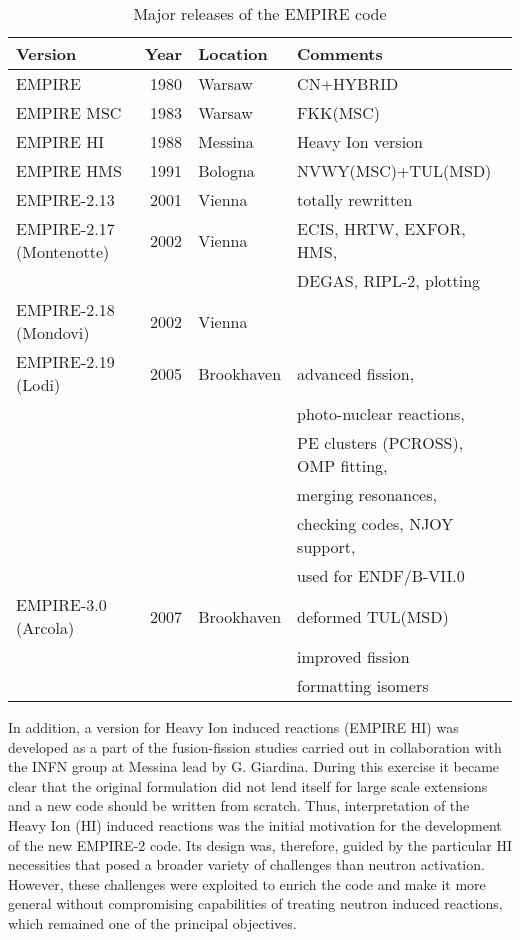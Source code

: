 \documentclass[twocolumn,amsmath,amssymb,10pt,groupedaddress,letter]{revtex4}
\begin{document}
\begin{table*}
\caption{Major releases of the EMPIRE code\label{tab:emp-history}}
\begin{tabular}{lrll}
\hline
\textbf{Version}       &\textbf{ Year }&\textbf{Location}&\textbf{Comments}   \\
\hline
   EMPIRE              &    1980    &    Warsaw     &  CN+HYBRID          \\
   EMPIRE MSC          &    1983    &    Warsaw     &  FKK(MSC)   \\
   EMPIRE HI           &    1988    &    Messina    &  Heavy Ion version \\
   EMPIRE HMS          &    1991    &    Bologna    &  NVWY(MSC)+TUL(MSD)   \\
   EMPIRE-2.13         &    2001    &    Vienna     &  totally rewritten  \\
   EMPIRE-2.17 (Montenotte)&2002    & Vienna        &  ECIS, HRTW, EXFOR, HMS,   \\
                        &           &               &  DEGAS, RIPL-2, plotting   \\
   EMPIRE-2.18 (Mondovi)&  2002     & Vienna        &                   \\
   EMPIRE-2.19 (Lodi)  &   2005     & Brookhaven    & advanced fission, \\
                       &            &               & photo-nuclear reactions, \\
                       &            &               & PE clusters (PCROSS), OMP fitting,\\
                       &            &               & merging resonances, \\
                       &            &               & checking codes, NJOY support,\\
                       &            &               & used for ENDF/B-VII.0 \\
   EMPIRE-3.0 (Arcola) &   2007     & Brookhaven    & deformed TUL(MSD)  \\
                       &            &               & improved fission \\
                       &            &               & formatting isomers \\
   \hline
\end{tabular}
\end{table*}


In addition, a version for Heavy Ion induced reactions (EMPIRE HI)
was developed as a part of the fusion-fission studies carried out in collaboration with the INFN group at Messina lead by G. Giardina. During this exercise it became clear that the original formulation did not lend itself for large scale extensions and a new code should be written from scratch. Thus, interpretation of the Heavy Ion (HI) induced reactions was the initial motivation for the development of the new EMPIRE-2 code. Its design was, therefore,  guided by the particular HI necessities that posed a  broader variety of challenges than neutron activation. However, these challenges were exploited to enrich the code and make it more general without compromising capabilities of treating neutron induced reactions, which remained one of the principal objectives.
\end{document}
